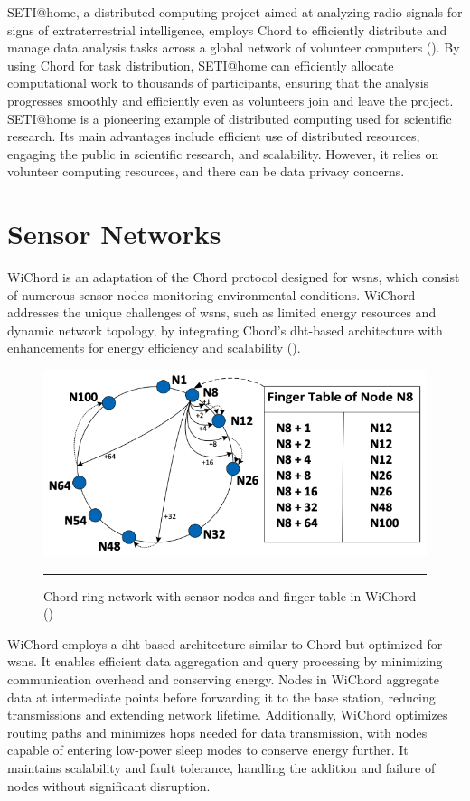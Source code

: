 SETI@home, a distributed computing project aimed at analyzing radio signals for signs of extraterrestrial intelligence, employs Chord to efficiently distribute and manage data analysis tasks across a global network of volunteer computers (\cite{anderson2002seti}).
By using Chord for task distribution, SETI@home can efficiently allocate computational work to thousands of participants, ensuring that the analysis progresses smoothly and efficiently even as volunteers join and leave the project.
SETI@home is a pioneering example of distributed computing used for scientific research.
Its main advantages include efficient use of distributed resources, engaging the public in scientific research, and scalability.
However, it relies on volunteer computing resources, and there can be data privacy concerns.

\section{Sensor Networks}
WiChord is an adaptation of the Chord protocol designed for \glspl{wsn}, which consist of numerous sensor nodes monitoring environmental conditions.
WiChord addresses the unique challenges of \glspl{wsn}, such as limited energy resources and dynamic network topology, by integrating Chord's \gls{dht}-based architecture with enhancements for energy efficiency and scalability (\cite{balatsouras2022wichord}).

\begin{figure}[htbp]
    \centering
 \includegraphics[width=.6\textwidth]{figures/chord-ring-network-sensor-nodes-finger-table.png}
     \rule{35em}{0.5pt}
    \caption{Chord ring network with sensor nodes and finger table in WiChord (\cite{balatsouras2022wichord})} 
\end{figure}


WiChord employs a \gls{dht}-based architecture similar to Chord but optimized for \glspl{wsn}.
It enables efficient data aggregation and query processing by minimizing communication overhead and conserving energy.
Nodes in WiChord aggregate data at intermediate points before forwarding it to the base station, reducing transmissions and extending network lifetime.
Additionally, WiChord optimizes routing paths and minimizes hops needed for data transmission, with nodes capable of entering low-power sleep modes to conserve energy further.
It maintains scalability and fault tolerance, handling the addition and failure of nodes without significant disruption.

